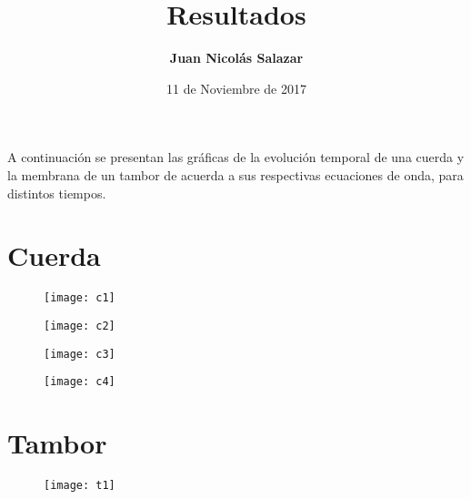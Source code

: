 \documentclass[letterpaper,11pt]{article}
\begin{document}

\title{\textbf{Resultados}}

\author[]{\textbf{Juan Nicolás Salazar}}
\date{11 de Noviembre de 2017}




\maketitle
 \noindent
A continuación se presentan las gráficas de la evolución temporal de una cuerda y la membrana de un tambor de acuerda a sus respectivas ecuaciones de onda, para distintos tiempos.

\section{Cuerda}

\begin{figure}[H]
    \centering
    \texttt{[image: c1]}
    \label{f1}
\end{figure}

\begin{figure}[H]
    \centering
    \texttt{[image: c2]}
    \label{f1}
\end{figure}

\begin{figure}[H]
    \centering
    \texttt{[image: c3]}
    \label{f1}
\end{figure}

\begin{figure}[H]
    \centering
    \texttt{[image: c4]}
    \label{f1}
\end{figure}

\section{Tambor}

\begin{figure}[H]
    \centering
    \texttt{[image: t1]}
    \label{f1}
\end{figure}
\end{document}
